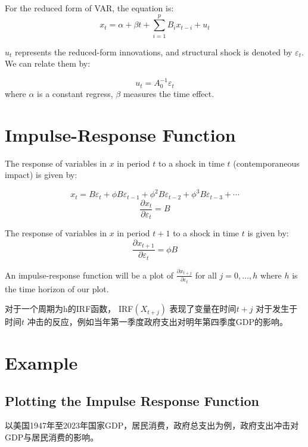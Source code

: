 \documentclass{article}
\begin{document}
\begin{CJK}{UTF8}{gbsn}
For the reduced form of VAR, the equation is:
\begin{equation}
    x_t = \alpha + \beta t + \sum_{i=1}^{p} B_ix_{t-i} + u_t
\end{equation}

 $u_t$ represents the reduced-form innovations, and structural shock is denoted by $\varepsilon_t$. We can relate them by:
 
\begin{equation}
    u_t = A_0^{-1} \varepsilon_t
\end{equation}
where  $\alpha$ is a constant regress, $\beta$ measures the time effect.

\section*{Impulse-Response Function}

The response of variables in $x$ in period $t$ to a shock in time $t$ (contemporaneous impact) is given by:

\begin{equation}
    x_t = B\varepsilon_t + \phi B\varepsilon_{t-1} + \phi^2 B\varepsilon_{t-2} + \phi^3 B\varepsilon_{t-3} + \cdots
\end{equation}
\begin{equation}
    \frac{\partial x_t}{\partial \varepsilon_t} = B
\end{equation}

The response of variables in $x$ in period $t+1$ to a shock in time $t$ is given by:
\begin{equation}
    \frac{\partial x_{t+1}}{\partial \varepsilon_t} = \phi B
\end{equation}

An impulse-response function will be a plot of $\frac{\partial x_{t+j}}{\partial \varepsilon_t}$ for all $j = 0, \ldots, h$ where $h$ is the time horizon of our plot.

对于一个周期为h的IRF函数，  IRF$(X_{t+j})$ 表现了变量在时间$t+j$ 对于发生于时间$t$ 冲击的反应，例如当年第一季度政府支出对明年第四季度GDP的影响。

\newpage
\section*{Example}
\subsection*{Plotting the Impulse Response Function}
以美国1947年至2023年国家GDP，居民消费，政府总支出为例，政府支出冲击对GDP与居民消费的影响。


\end{CJK}
\end{document}
